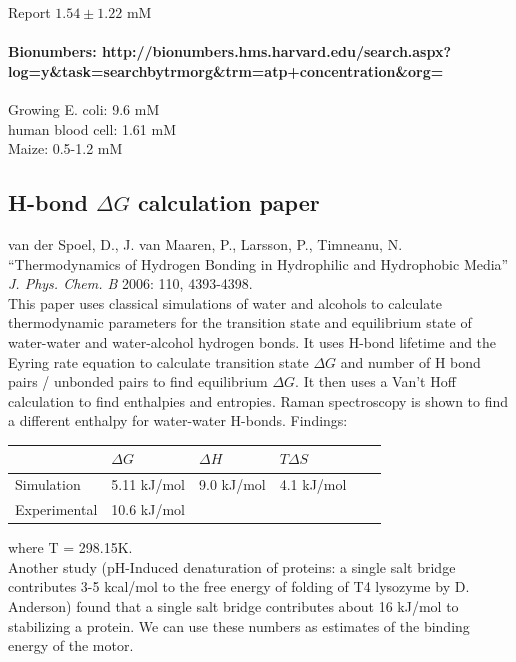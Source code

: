 \documentclass[10pt]{article} %
\begin{document}
Report $1.54\pm1.22$ mM\\

\paragraph{Bionumbers: http://bionumbers.hms.harvard.edu/search.aspx?log=y\&task=searchbytrmorg\&trm=atp+concentration\&org=}

Growing E. coli: 9.6 mM\\
human blood cell: 1.61 mM\\
Maize: 0.5-1.2 mM\\

\subsection{H-bond $\Delta G$ calculation paper}
van der Spoel, D., J. van Maaren, P., Larsson, P., Timneanu, N. ``Thermodynamics of Hydrogen Bonding in Hydrophilic and Hydrophobic Media'' \textit{J. Phys. Chem. B} 2006: 110, 4393-4398.\\

This paper uses classical simulations of water and alcohols to calculate thermodynamic parameters for the transition state and equilibrium state of water-water and water-alcohol
hydrogen bonds. It uses H-bond lifetime and the Eyring rate equation to calculate transition state $\Delta G$ and number of H bond pairs / unbonded pairs to find equilibrium
$\Delta G$. It then uses a Van't Hoff calculation to find enthalpies and entropies. Raman spectroscopy is shown to find a different enthalpy for water-water H-bonds. Findings:

\begin{center}
  \begin{tabular}{| l | l | l | l | l | l |}
    \hline
    & $\Delta G$ & $\Delta H$ & $T\Delta S$ \\\hline
    Simulation & 5.11 kJ/mol & 9.0 kJ/mol & 4.1 kJ/mol\\ \hline
    Experimental & 10.6 kJ/mol & & \\ \hline
  \end{tabular}
\end{center}

where T = 298.15K.\\

Another study (pH-Induced denaturation of proteins: a single salt bridge contributes 3-5 kcal/mol to the free energy of folding of T4 lysozyme by D. Anderson) found that
a single salt bridge contributes about 16 kJ/mol to stabilizing a protein. We can use these numbers as estimates of the binding energy of the motor.\\
\end{document}
